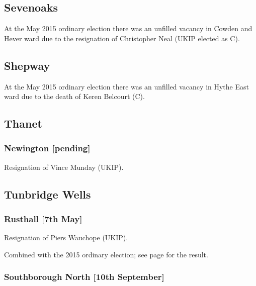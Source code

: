 \documentclass[a4paper,openany]{book}
\begin{document}
\begin{resultsiii}
\subsection*{Sevenoaks}

At the May 2015 ordinary election there was an unfilled vacancy in Cowden and Hever ward due to the resignation of Christopher Neal (UKIP elected as C).

\subsection*{Shepway}

At the May 2015 ordinary election there was an unfilled vacancy in Hythe East ward due to the death of Keren Belcourt (C).

\subsection*{Thanet}

\subsubsection*{Newington \hspace*{\fill}\nolinebreak[1]%
\enspace\hspace*{\fill}
[pending]}


Resignation of Vince Munday (UKIP).

\subsection*{Tunbridge Wells}

\subsubsection*{Rusthall \hspace*{\fill}\nolinebreak[1]%
\enspace\hspace*{\fill}
[7th May]}


Resignation of Piers Wauchope (UKIP).

Combined with the 2015 ordinary election; see page \pageref{RusthallTunbridgeWells} for the result.

\subsubsection*{Southborough North \hspace*{\fill}\nolinebreak[1]%
\enspace\hspace*{\fill}
[10th September]}


\end{resultsiii}
\end{document}
